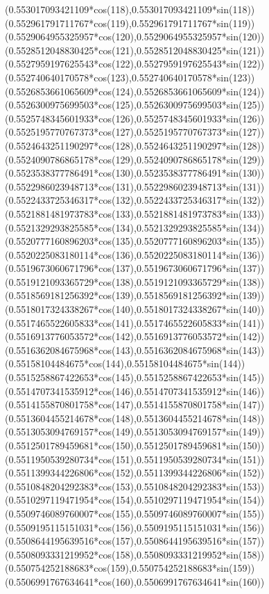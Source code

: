 {({0.553017093421109*cos(118)},{0.553017093421109*sin(118)})
({0.552961791711767*cos(119)},{0.552961791711767*sin(119)})
({0.5529064955325957*cos(120)},{0.5529064955325957*sin(120)})
({0.5528512048830425*cos(121)},{0.5528512048830425*sin(121)})
({0.5527959197625543*cos(122)},{0.5527959197625543*sin(122)})
({0.552740640170578*cos(123)},{0.552740640170578*sin(123)})
({0.5526853661065609*cos(124)},{0.5526853661065609*sin(124)})
({0.5526300975699503*cos(125)},{0.5526300975699503*sin(125)})
({0.5525748345601933*cos(126)},{0.5525748345601933*sin(126)})
({0.5525195770767373*cos(127)},{0.5525195770767373*sin(127)})
({0.5524643251190297*cos(128)},{0.5524643251190297*sin(128)})
({0.5524090786865178*cos(129)},{0.5524090786865178*sin(129)})
({0.5523538377786491*cos(130)},{0.5523538377786491*sin(130)})
({0.5522986023948713*cos(131)},{0.5522986023948713*sin(131)})
({0.5522433725346317*cos(132)},{0.5522433725346317*sin(132)})
({0.5521881481973783*cos(133)},{0.5521881481973783*sin(133)})
({0.5521329293825585*cos(134)},{0.5521329293825585*sin(134)})
({0.5520777160896203*cos(135)},{0.5520777160896203*sin(135)})
({0.5520225083180114*cos(136)},{0.5520225083180114*sin(136)})
({0.5519673060671796*cos(137)},{0.5519673060671796*sin(137)})
({0.5519121093365729*cos(138)},{0.5519121093365729*sin(138)})
({0.5518569181256392*cos(139)},{0.5518569181256392*sin(139)})
({0.5518017324338267*cos(140)},{0.5518017324338267*sin(140)})
({0.5517465522605833*cos(141)},{0.5517465522605833*sin(141)})
({0.5516913776053572*cos(142)},{0.5516913776053572*sin(142)})
({0.5516362084675968*cos(143)},{0.5516362084675968*sin(143)})
({0.55158104484675*cos(144)},{0.55158104484675*sin(144)})
({0.5515258867422653*cos(145)},{0.5515258867422653*sin(145)})
({0.5514707341535912*cos(146)},{0.5514707341535912*sin(146)})
({0.5514155870801758*cos(147)},{0.5514155870801758*sin(147)})
({0.5513604455214678*cos(148)},{0.5513604455214678*sin(148)})
({0.5513053094769157*cos(149)},{0.5513053094769157*sin(149)})
({0.5512501789459681*cos(150)},{0.5512501789459681*sin(150)})
({0.5511950539280734*cos(151)},{0.5511950539280734*sin(151)})
({0.5511399344226806*cos(152)},{0.5511399344226806*sin(152)})
({0.5510848204292383*cos(153)},{0.5510848204292383*sin(153)})
({0.5510297119471954*cos(154)},{0.5510297119471954*sin(154)})
({0.5509746089760007*cos(155)},{0.5509746089760007*sin(155)})
({0.5509195115151031*cos(156)},{0.5509195115151031*sin(156)})
({0.5508644195639516*cos(157)},{0.5508644195639516*sin(157)})
({0.5508093331219952*cos(158)},{0.5508093331219952*sin(158)})
({0.550754252188683*cos(159)},{0.550754252188683*sin(159)})
({0.5506991767634641*cos(160)},{0.5506991767634641*sin(160)})
}
